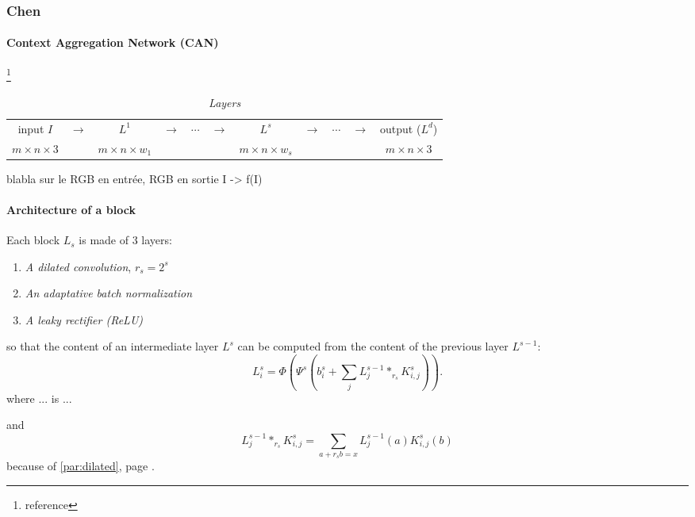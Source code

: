 \documentclass{article}
\begin{document}
        \subsubsection{Chen}
            \paragraph{Context Aggregation Network (CAN)}\footnote{reference}
            \begin{table}[!ht]
                \center
                \begin{tabular}{ccccccccccc}
                    \hline
                    input $I$ & $\longrightarrow$ & $L^1$ & $\longrightarrow$ & $\cdots$ & $\longrightarrow$ & $L^s$ & $\longrightarrow$ & $\cdots$ & $\longrightarrow$ & output ($L^d$)\\
                    $m\times n\times 3$ & & $m\times n\times w_1$ & & & & $m\times n\times w_s$ & & & & $m\times n\times 3$\\
                    \hline
                \end{tabular}
                \caption{\textit{Layers}}
            \end{table}
            blabla sur le RGB en entrée, RGB en sortie I -> f(I)
            \paragraph{Architecture of a block}
            Each block $L_s$ is made of 3 layers:
            \begin{enumerate}
                \item \textit{A dilated convolution}, $r_s=2^s$
                \item \textit{An adaptative batch normalization}
                \item \textit{A leaky rectifier (ReLU)}
            \end{enumerate}
            so that the content of an intermediate layer $L^s$ can be computed from the content of the previous layer $L^{s-1}$:
            \begin{equation}
                L_i^s=\Phi\left(\Psi^s\left(b_i^s+\sum_jL_j^{s-1}*_{r_s}K^s_{i,j}\right)\right).
            \end{equation}
            where ... is ...

            and
            \begin{equation}
                L_j^{s-1}*_{r_s}K^s_{i,j}=\sum_{a+r_sb=x}L_j^{s-1}(a)K_{i,j}^s(b)
            \end{equation}
            because of \ref{par:dilated}, page \pageref{par:dilated}.
\end{document}

